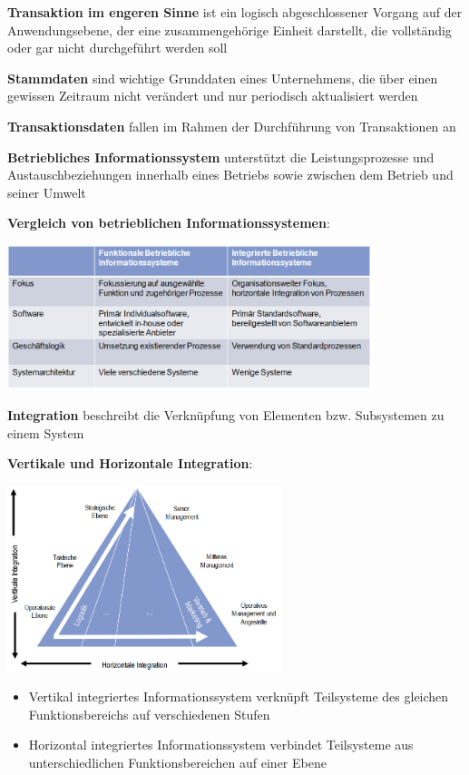\textbf{Transaktion im engeren Sinne} ist ein logisch abgeschlossener Vorgang auf der Anwendungsebene, der eine
zusammengehörige Einheit darstellt, die vollständig oder gar nicht durchgeführt werden soll

\textbf{Stammdaten} sind wichtige Grunddaten eines Unternehmens, die über einen gewissen Zeitraum nicht verändert und nur periodisch aktualisiert werden 

\textbf{Transaktionsdaten} fallen im Rahmen der Durchführung von Transaktionen an 

\textbf{Betriebliches Informationssystem} unterstützt die Leistungsprozesse und Austauschbeziehungen innerhalb eines Betriebs sowie zwischen dem Betrieb und seiner Umwelt

\textbf{Vergleich von betrieblichen Informationssystemen}:
\begin{center}
	\includegraphics[width=0.8\textwidth]{images/informationssysteme.png}
\end{center}

\textbf{Integration} beschreibt die Verknüpfung von Elementen bzw. Subsystemen zu einem System

\textbf{Vertikale und Horizontale Integration}:
\begin{center}
	\includegraphics[width=0.6\textwidth]{images/integration.png}
\end{center}
\begin{itemize}
	\item Vertikal integriertes Informationssystem verknüpft Teilsysteme des gleichen Funktionsbereichs auf verschiedenen Stufen
	\item Horizontal integriertes Informationssystem verbindet Teilsysteme aus unterschiedlichen Funktionsbereichen auf einer Ebene
\end{itemize}

